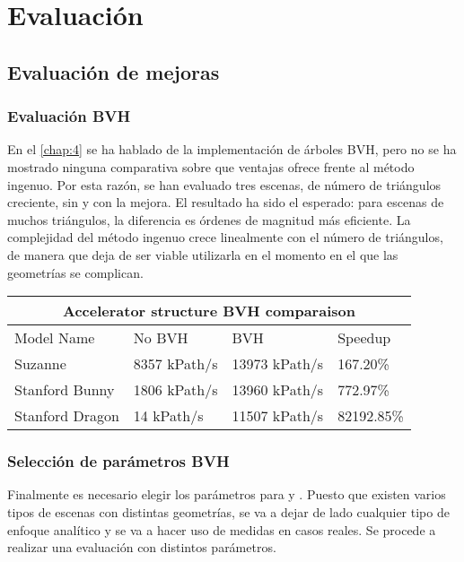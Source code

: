 \chapter{Evaluación}
\label{chap:evaluation}
\label{chap:5}

\section{Evaluación de mejoras}

\subsection{Evaluación BVH}
	
En el \autoref{chap:4} se ha hablado de la implementación de árboles BVH, pero no se ha mostrado ninguna comparativa sobre que ventajas ofrece frente al método ingenuo. Por esta razón, se han evaluado tres escenas, de número de triángulos creciente, sin y con la mejora. El resultado ha sido el esperado: para escenas de muchos triángulos, la diferencia es órdenes de magnitud más eficiente. La complejidad del método ingenuo crece linealmente con el número de triángulos, de manera que deja de ser viable utilizarla en el momento en el que las geometrías se complican.\\

\begin{tabular}{ |p{3cm}||p{3cm}|p{3cm}|p{3cm}| }
	 \hline
	 \multicolumn{4}{|c|}{Accelerator structure BVH comparaison} \\
	 \hline
	 Model Name&No BVH&BVH&Speedup\\
	 \hline
	 Suzanne   &8357 kPath/s&13973 kPath/s&167.20\%\\
	 Stanford Bunny &1806 kPath/s&13960 kPath/s&772.97\%\\
	 Stanford Dragon &14 kPath/s &11507 kPath/s&82192.85\%\\
	 \hline
\end{tabular}

\subsection{Selección de parámetros BVH}
	
Finalmente es necesario elegir los parámetros para  y . Puesto que existen varios tipos de escenas con distintas geometrías, se va a dejar de lado cualquier tipo de enfoque analítico y se va a hacer uso de medidas en casos reales. Se procede a realizar una evaluación con distintos parámetros.
	
